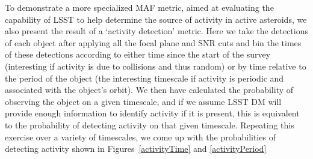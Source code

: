 \documentclass{iau}
\begin{document}
To demonstrate a more specialized MAF metric, aimed at evaluating the
capability of LSST to help determine the source of activity in active
asteroids, we also present the result of a `activity detection'
metric. Here we take the detections of each object after applying all
the focal plane and SNR cuts and bin the times of these detections
according to either time since the start of the survey (interesting if
activity is due to collisions and thus random) or by time relative to the
period of the object (the interesting timescale if activity is
periodic and associated with the object's orbit). We
then have calculated the probability of observing the object on a
given timescale, and if we assume LSST DM will provide enough
information to identify activity if it is present, this is equivalent
to the probability of detecting activity on that given
timescale. Repeating this exercise over a variety of timescales, we
come up with the probabilities of detecting activity shown in
Figures~\ref{activityTime} and \ref{activityPeriod}
\end{document}
